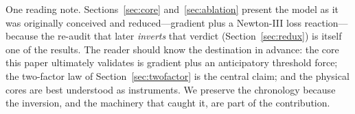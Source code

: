 One reading note. Sections~\ref{sec:core} and~\ref{sec:ablation} present the model as it was originally conceived and reduced---gradient plus a Newton-III loss reaction---because the re-audit that later \emph{inverts} that verdict (Section~\ref{sec:redux}) is itself one of the results. The reader should know the destination in advance: the core this paper ultimately validates is gradient plus an anticipatory threshold force; the two-factor law of Section~\ref{sec:twofactor} is the central claim; and the physical cores are best understood as instruments. We preserve the chronology because the inversion, and the machinery that caught it, are part of the contribution.
